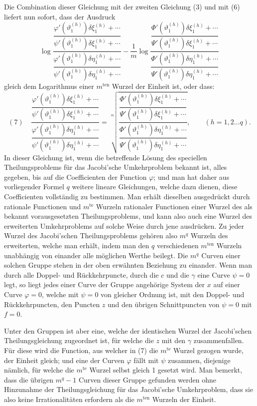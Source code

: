 \documentclass[10pt]{article}
\begin{document}
Die Combination dieser Gleichung mit der zweiten Gleichung (3) und mit (6) liefert nun sofort, dass der Ausdruck
\[
\log\frac{\dfrac{\varphi'(\vartheta_1^{(h)})\delta\xi_1^{(h)}+\cdots}
{\psi'(\vartheta_1^{(h)})\delta\xi_1^{(h)}+\cdots}}
{\dfrac{\varphi'(\vartheta_1^{(h)})\delta\eta_1^{(h)}+\cdots}
{\psi'(\vartheta_1^{(h)})\delta\eta_1^{(h)}+\cdots}}
-\frac1m
\log\frac{\dfrac{\Phi'(\vartheta_1^{(h)})\delta\xi_1^{(h)}+\cdots}
{\Psi'(\vartheta_1^{(h)})\delta\xi_1^{(h)}+\cdots}}
{\dfrac{\Phi'(\vartheta_1^{(h)})\delta\eta_1^{(h)}+\cdots}
{\Psi'(\vartheta_1^{(h)})\delta\eta_1^{(h)}+\cdots}}
\]
gleich dem Logarithmus einer \(m^{\mathrm{ten}}\) Wurzel der Einheit ist, oder dass:
\[
(7)\quad
\frac{\dfrac{\varphi'(\vartheta_1^{(h)})\delta\xi_1^{(h)}+\cdots}
{\psi'(\vartheta_1^{(h)})\delta\xi_1^{(h)}+\cdots}}
{\dfrac{\varphi'(\vartheta_1^{(h)})\delta\eta_1^{(h)}+\cdots}
{\psi'(\vartheta_1^{(h)})\delta\eta_1^{(h)}+\cdots}}
=
\sqrt[m]{
\frac{\dfrac{\Phi'(\vartheta_1^{(h)})\delta\xi_1^{(h)}+\cdots}
{\Psi'(\vartheta_1^{(h)})\delta\xi_1^{(h)}+\cdots}}
{\dfrac{\Phi'(\vartheta_1^{(h)})\delta\eta_1^{(h)}+\cdots}
{\Psi'(\vartheta_1^{(h)})\delta\eta_1^{(h)}+\cdots}}
},
\qquad (h=1,2\ldots q).
\]
In dieser Gleichung ist, wenn die betreffende Lösung des speciellen Theilungsproblems für das Jacobi'sche Umkehrproblem bekannt ist, alles gegeben, bis auf die Coefficienten der Function \(\varphi\); und man hat daher aus vorliegender Formel \(q\) weitere lineare Gleichungen, welche dazu dienen, diese Coefficienten vollständig zu bestimmen. Man erhält dieselben ausgedrückt durch rationale Functionen und \(m^{\mathrm{te}}\) Wurzeln rationaler Functionen einer Wurzel des als bekannt vorausgesetzten Theilungsproblems, und kann also auch eine Wurzel des erweiterten Umkehrproblems auf solche Weise durch jene ausdrücken. Zu jeder Wurzel des Jacobi'schen Theilungsproblems gehören also \(m^q\) Wurzeln des erweiterten, welche man erhält, indem man den \(q\) verschiedenen \(m^{\mathrm{ten}}\) Wurzeln unabhängig von einander alle möglichen Werthe beilegt. Die \(m^q\) Curven einer solchen Gruppe stehen in der oben erwähnten Beziehung zu einander. Wenn man durch alle Doppel- und Rückkehrpuncte, durch die \(c\) und die \(\gamma\) eine Curve \(\psi=0\) legt, so liegt jedes einer Curve der Gruppe angehörige System der \(x\) auf einer Curve \(\varphi=0\), welche mit \(\psi=0\) von gleicher Ordnung ist, mit den Doppel- und Rückkehrpuncten, den Puncten \(z\) und den übrigen Schnittpuncten von \(\psi=0\) mit \(f=0\).

Unter den Gruppen ist aber eine, welche der identischen Wurzel der Jacobi'schen Theilungsgleichung zugeordnet ist, für welche die \(z\) mit den \(\gamma\) zusammenfallen. Für diese wird die Function, aus welcher in (7) die \(m^{\mathrm{te}}\) Wurzel gezogen wurde, der Einheit gleich; und eine der Curven \(\varphi\) fällt mit \(\psi\) zusammen, diejenige nämlich, für welche die \(m^{\mathrm{te}}\) Wurzel selbst gleich 1 gesetzt wird. Man bemerkt, dass die übrigen \(m^q-1\) Curven dieser Gruppe gefunden werden ohne Hinzunahme der Theilungsgleichung für das Jacobi'sche Umkehrproblem, dass sie also keine Irrationalitäten erfordern als die \(m^{\mathrm{ten}}\) Wurzeln der Einheit.
\end{document}
